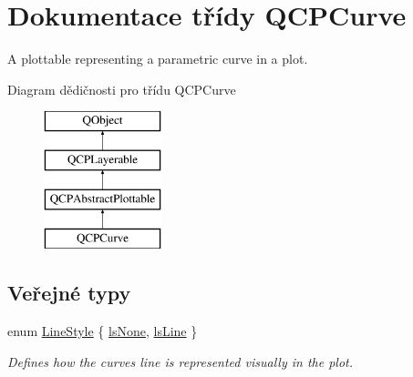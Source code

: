 \hypertarget{classQCPCurve}{}\section{Dokumentace třídy Q\+C\+P\+Curve}
\label{classQCPCurve}


A plottable representing a parametric curve in a plot.  


Diagram dědičnosti pro třídu Q\+C\+P\+Curve\begin{figure}[H]
\begin{center}
\leavevmode
\includegraphics[height=4.000000cm]{classQCPCurve}
\end{center}
\end{figure}
\subsection*{Veřejné typy}
\begin{DoxyCompactItemize}
\item 
enum \hyperlink{classQCPCurve_a2710e9f79302152cff794c6e16cc01f1}{Line\+Style} \{ \hyperlink{classQCPCurve_a2710e9f79302152cff794c6e16cc01f1aec1601a191cdf0b4e761c4c66092cc48}{ls\+None}, 
\hyperlink{classQCPCurve_a2710e9f79302152cff794c6e16cc01f1ade5822ce6fbf131d3df131795c2e1003}{ls\+Line}
 \}\begin{DoxyCompactList}\small\item\em Defines how the curve\textquotesingle{}s line is represented visually in the plot. \end{DoxyCompactList}
\end{DoxyCompactItemize}
